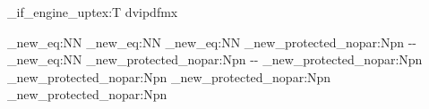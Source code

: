 
\sys_if_engine_uptex:T {  {dvipdfmx} }

\cs_new_eq:NN \layoutwidth \Gm@layoutwidth
\cs_new_eq:NN \layoutheight \Gm@layoutheight
\cs_new_eq:NN \layouttoffset \Gm@layoutvoffset 
\cs_new_protected_nopar:Npn \layoutboffset 
  { \dimexpr\paperheight-\Gm@layoutvoffset-\Gm@layoutheight\relax }
\cs_new_eq:NN \layoutloffset \Gm@layouthoffset
\cs_new_protected_nopar:Npn \layoutroffset
  { \dimexpr\paperwidth-\Gm@layouthoffset-\Gm@layoutwidth\relax }
\cs_new_protected_nopar:Npn \bodylmargin { \dimexpr\Gm@lmargin\relax }
\cs_new_protected_nopar:Npn \bodyrmargin { \dimexpr\Gm@rmargin\relax }
\cs_new_protected_nopar:Npn \bodytmargin { \dimexpr\Gm@tmargin\relax }
\cs_new_protected_nopar:Npn \bodybmargin { \dimexpr\Gm@bmargin\relax }

